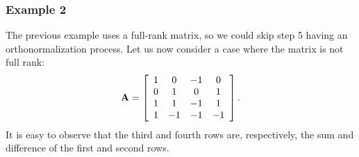 \subsubsection{Example 2}

The previous example uses a full-rank matrix, so we could skip step 5 having an orthonormalization process. Let us now consider a case where the matrix is not full rank:
\begin{align}
  \mathbf{A} = \left[ \begin{array}{c c c c}
   1 &  0 & -1 &  0 \\
   0 &  1 &  0 &  1 \\
   1 &  1 & -1 &  1 \\
   1 & -1 & -1 & -1 \\ \end{array} \right] .
\end{align}
It is easy to observe that the third and fourth rows are, respectively, the sum and difference of the first and second rows.

